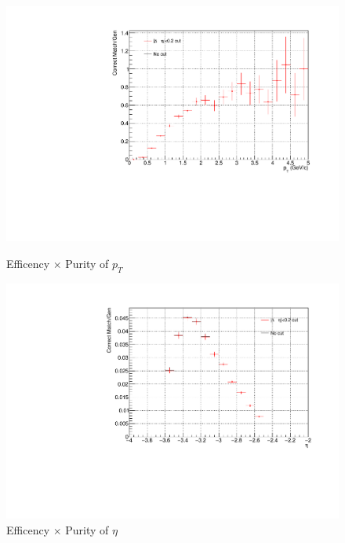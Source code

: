 \begin{figure}[htbp]
                \\
                \vspace{1em}
                \begin{minipage}{0.45\textwidth}
                    \centering
                    \includegraphics[width=\textwidth]{fig/3_5_6_effpuri_pt.pdf}
                    \caption{Efficency $\times$ Purity of $p_T$}
                    \label{EffPuri_of_pt}
                \end{minipage}
                \hfill
                \begin{minipage}{0.45\textwidth}
                    \centering
                    \includegraphics[width=\textwidth]{fig/3_5_6_effpuri_eta.pdf}
                    \caption{Efficency $\times$ Purity of $\eta$}
                    \label{EffPuri_of_eta}
                \end{minipage}
            \end{figure}

